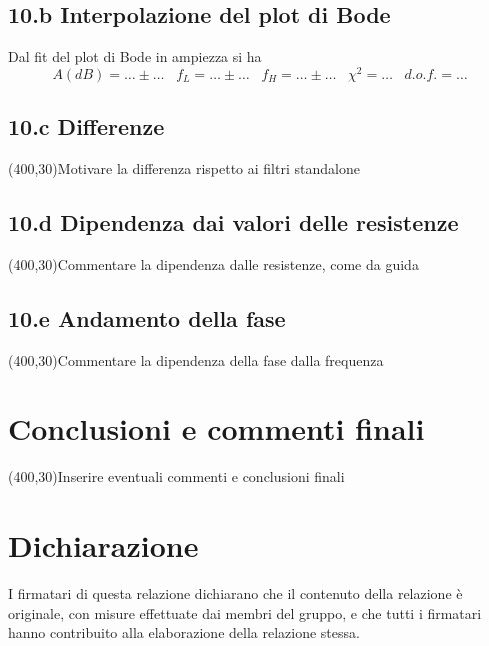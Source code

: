 \documentclass[10pt,a4paper]{article}
\begin{document}
\subsection*{10.b Interpolazione del plot di Bode}
Dal fit del plot di Bode in ampiezza si ha
\[
A(dB) = \ldots\pm \ldots \;\;\;f_{L} = \ldots\pm \ldots\;\;\;f_{H} = \ldots\pm 
\ldots\;\;\;\chi^2 = \ldots\;\;\; d.o.f.= \ldots
\]
\subsection*{10.c Differenze}
\vspace{0.5cm}
\framebox(400,30){Motivare la differenza rispetto ai filtri standalone}

\subsection*{10.d Dipendenza dai valori delle resistenze}
\vspace{0.5cm}
\framebox(400,30){Commentare la dipendenza dalle resistenze, come da guida}

\subsection*{10.e Andamento della fase}
\vspace{0.5cm}
\framebox(400,30){Commentare la dipendenza della fase dalla frequenza}

\section*{Conclusioni e commenti finali}
\framebox(400,30){Inserire eventuali commenti e conclusioni finali}

\section*{Dichiarazione}
I firmatari di questa relazione dichiarano che il contenuto della relazione \`e 
originale, con misure effettuate dai membri del gruppo, e che tutti i firmatari 
hanno contribuito alla elaborazione della relazione stessa.
\end{document}
